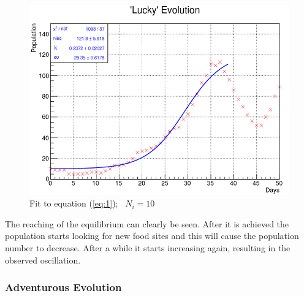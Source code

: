 \documentclass[a4paper,prd,twocolumn,nofootinbib,superscriptaddress,floatfix]{revtex4}
\begin{document}
\begin{figure}[H]
\centering
  \includegraphics[scale=0.35]{lucky.png}
\caption{Fit to equation  (\ref{eq:1}); \ $N_i=10$ \  }
  \label{fig:8}
\end{figure}

The reaching of the equilibrium can clearly be seen. After it is achieved the population starts looking for new food sites and this will cause the population number to decrease. After a while it starts increasing again, resulting in the observed oscillation.


\subsubsection{Adventurous Evolution}
\end{document}
